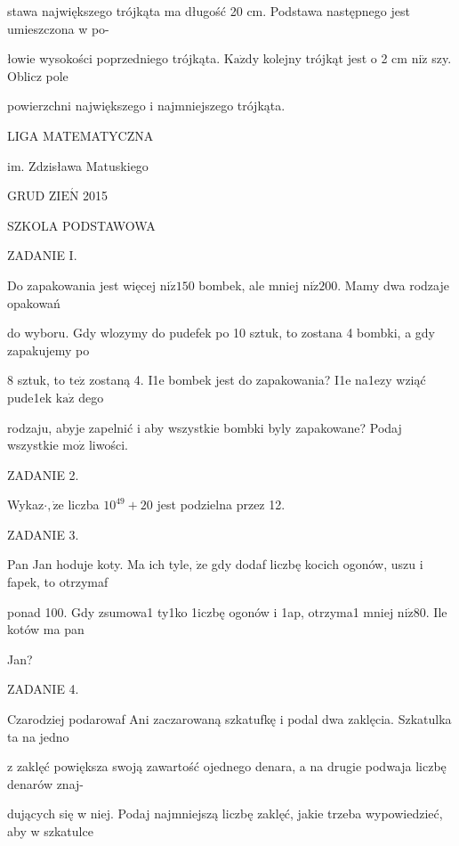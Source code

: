 \documentclass[a4paper,12pt]{article}
\begin{document}
stawa największego trójkąta ma długość 20 cm. Podstawa następnego jest umieszczona w po-

łowie wysokości poprzedniego trójkąta. $\mathrm{K}\mathrm{a}\dot{\mathrm{z}}\mathrm{d}\mathrm{y}$ kolejny trójkąt jest o 2 cm $\mathrm{n}\mathrm{i}\dot{\mathrm{z}}$ szy. Oblicz pole

powierzchni największego i najmniejszego trójkąta.






LIGA MATEMATYCZNA

im. Zdzisława Matuskiego

GRUD Z$\mathrm{I}\mathrm{E}\acute{\mathrm{N}}$ 2015

SZKOLA PODSTAWOWA

ZADANIE I.

Do zapakowania jest więcej $\mathrm{n}\mathrm{i}\dot{\mathrm{z}}150$ bombek, ale mniej $\mathrm{n}\mathrm{i}\dot{\mathrm{z}}200$. Mamy dwa rodzaje opakowań

do wyboru. Gdy wlozymy do pudefek po 10 sztuk, to zostana 4 bombki, a gdy zapakujemy po

8 sztuk, to $\mathrm{t}\mathrm{e}\dot{\mathrm{z}}$ zostaną 4. I1e bombek jest do zapakowania? I1e na1ezy wziąć pude1ek $\mathrm{k}\mathrm{a}\dot{\mathrm{z}}$ dego

rodzaju, abyje zapelnić i aby wszystkie bombki byly zapakowane? Podaj wszystkie $\mathrm{m}\mathrm{o}\dot{\mathrm{z}}$ liwości.

ZADANIE 2.

Wykaz$\cdot, \dot{\mathrm{z}}\mathrm{e}$ liczba $10^{49}+20$ jest podzielna przez 12.

ZADANIE 3.

Pan Jan hoduje koty. Ma ich tyle, $\dot{\mathrm{z}}\mathrm{e}$ gdy dodaf liczbę kocich ogonów, uszu i fapek, to otrzymaf

ponad 100. Gdy zsumowa1 ty1ko 1iczbę ogonów i 1ap, otrzyma1 mniej $\mathrm{n}\mathrm{i}\dot{\mathrm{z}}80$. Ile kotów ma pan

Jan?

ZADANIE 4.

Czarodziej podarowaf Ani zaczarowaną szkatufkę i podal dwa zaklęcia. Szkatulka ta na jedno

z zaklęć powiększa swoją zawartość ojednego denara, a na drugie podwaja liczbę denarów znaj-

dujących się w niej. Podaj najmniejszą liczbę zaklęć, jakie trzeba wypowiedzieć, aby w szkatulce
\end{document}
